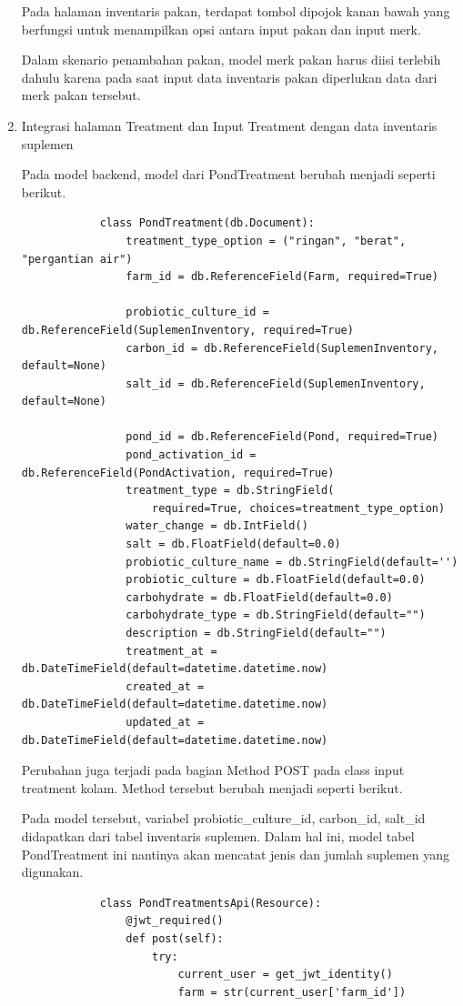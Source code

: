\begin{spacing}{1.5}
\begin{enumerate}
		Pada halaman inventaris pakan, terdapat tombol dipojok kanan bawah yang berfungsi untuk menampilkan opsi antara input pakan dan input merk.

		Dalam skenario penambahan pakan, model merk pakan harus diisi terlebih dahulu karena pada saat input data inventaris pakan diperlukan data dari merk pakan tersebut.

		\item Integrasi halaman Treatment dan Input Treatment dengan data inventaris suplemen
		
		Pada model backend, model dari PondTreatment berubah menjadi seperti berikut.

		\begin{lstlisting}
			class PondTreatment(db.Document):
				treatment_type_option = ("ringan", "berat", "pergantian air")
				farm_id = db.ReferenceField(Farm, required=True)

				probiotic_culture_id = db.ReferenceField(SuplemenInventory, required=True)
				carbon_id = db.ReferenceField(SuplemenInventory, default=None)
				salt_id = db.ReferenceField(SuplemenInventory, default=None)

				pond_id = db.ReferenceField(Pond, required=True)
				pond_activation_id = db.ReferenceField(PondActivation, required=True)
				treatment_type = db.StringField(
					required=True, choices=treatment_type_option)
				water_change = db.IntField()
				salt = db.FloatField(default=0.0)
				probiotic_culture_name = db.StringField(default='')
				probiotic_culture = db.FloatField(default=0.0)
				carbohydrate = db.FloatField(default=0.0)
				carbohydrate_type = db.StringField(default="")
				description = db.StringField(default="")
				treatment_at = db.DateTimeField(default=datetime.datetime.now)
				created_at = db.DateTimeField(default=datetime.datetime.now)
				updated_at = db.DateTimeField(default=datetime.datetime.now)
		\end{lstlisting}

		Perubahan juga terjadi pada bagian Method POST pada class input treatment kolam. Method tersebut berubah menjadi seperti berikut.

		Pada model tersebut, variabel probiotic\_culture\_id, carbon\_id, salt\_id didapatkan dari tabel inventaris suplemen. Dalam hal ini, model tabel PondTreatment ini nantinya akan mencatat jenis dan jumlah suplemen yang digunakan.

		\begin{lstlisting}
			class PondTreatmentsApi(Resource):
				@jwt_required()
				def post(self):
					try:
						current_user = get_jwt_identity()
						farm = str(current_user['farm_id'])
						

\end{lstlisting}
\end{enumerate}
\end{spacing}
